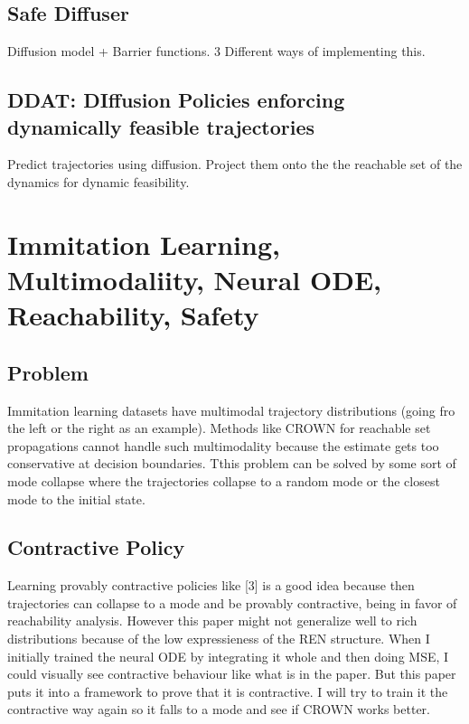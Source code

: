 \documentclass[12pt]{article}
\begin{document}
\subsection{Safe Diffuser}
Diffusion model + Barrier functions. 3 Different ways of implementing this.

\subsection{DDAT: DIffusion Policies enforcing dynamically feasible trajectories}
Predict trajectories using diffusion. Project them onto the the reachable set of the dynamics for dynamic feasibility. 

\section{Immitation Learning, Multimodaliity, Neural ODE, Reachability, Safety}
\subsection{Problem}
Immitation learning datasets have multimodal trajectory distributions (going fro the left or the right as an example). Methods like CROWN for reachable set propagations cannot handle such multimodality because the estimate gets too conservative at decision boundaries.
Tthis problem can be solved by some sort of mode collapse where the trajectories collapse to a random mode or the closest mode to the initial state.   

\subsection{Contractive Policy}
Learning provably contractive policies like [3] is a good idea because then trajectories can collapse to a mode and be provably contractive, being in favor of reachability analysis. 
However this paper might not generalize well to rich distributions because of the low expressieness of the REN structure. When I initially trained the neural ODE by integrating it whole and then doing MSE, I could visually see contractive behaviour like what is in the paper.
But this paper puts it into a framework to prove that it is contractive. I will try to train it the contractive way again so it falls to a mode and see if CROWN works better. 
\end{document}

